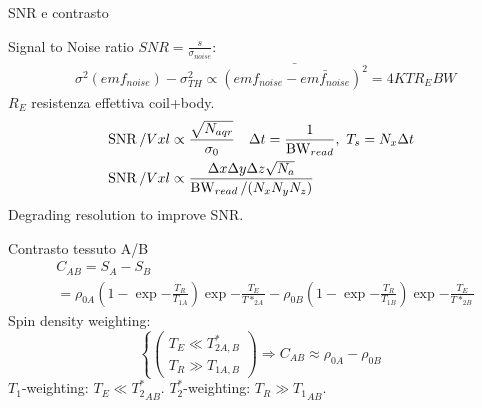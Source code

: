 \begin{frame}[allowframebreaks]{SNR e contrasto}
\begin{block}{Signal to Noise ratio}
$SNR=\frac{s}{\sigma_{noise}}$:
\begin{align*}
&\sigma^2(emf_{noise})-\sigma_{TH}^2\propto\bar{(emf_{noise}-\bar{emf_{noise}})^2}=4KTR_EBW
\end{align*}
$R_E$ resistenza effettiva coil+body.
\begin{align*}
&\operatorname{SNR}/Vxl\propto\frac{\sqrt{N_{aqr}}}{\sigma_0}\quad \Delta t= \frac{1}{\operatorname{BW}_{read}},\ T_s=N_x\Delta t\\
&\operatorname{SNR}/Vxl\propto \frac{\Delta x\Delta y\Delta z\sqrt{N_a}}{\operatorname{BW}_{read}/(N_xN_yN_z)}
\end{align*}
Degrading resolution to improve SNR.
\end{block}
\begin{block}{Contrasto tessuto A/B}
\begin{align*}
&C_{AB}=S_A-S_B\\
&=\rho_{0A}(1-\exp{-\frac{T_R}{T_{1A}}})\exp{-\frac{T_E}{T*_{2A}}}-\rho_{0B}(1-\exp{-\frac{T_R}{T_{1B}}})\exp{-\frac{T_E}{T*_{2B}}}
\end{align*}
Spin density weighting:
\begin{equation*}
\left\{\begin{pmatrix}T_E\ll T_{2A,B}^*\\ T_R\gg T_{1A,B}\end{pmatrix}\right.\Rightarrow C_{AB}\approx\rho_{0A}-\rho_{0B}
\end{equation*}
$T_1$-weighting: $T_E\ll {T_2^*}_{AB}$.
$T_2^*$-weighting: $T_R\gg {T_1}_{AB}$.
\end{block}
\end{frame}